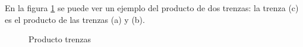 En la figura \ref{grupo0} se puede ver un ejemplo del producto de dos trenzas: la trenza (c) es el producto de las trenzas (a) y (b).\\
   \begin{figure}[h!]
   	\centering
   	\space
   	\caption{Producto trenzas}
   	\label{grupo0} 
   \end{figure}

